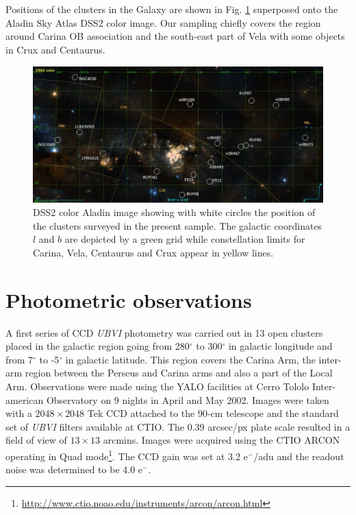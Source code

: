 \documentclass[draft]{aa}
\begin{document}
Positions of the clusters in the Galaxy are shown in Fig. \ref{fig1} superposed
onto the Aladin Sky Atlas DSS2 color image. Our sampling chiefly covers the
region around Carina OB association and the south-east part of Vela with some
objects in Crux and Centaurus.

\begin{figure}[ht]
    \centering
    \includegraphics[width=\hsize]{../figs/DSS2color.png}
    \caption{DSS2 color Aladin image showing with white circles the position of
    the clusters surveyed in the present sample. The galactic coordinates $l$
    and $b$ are depicted by a green grid while constellation limits for Carina,
    Vela, Centaurus and Crux appear in yellow lines.}
    \label{fig1}
\end{figure}




\section{Photometric observations}
\label{sec:photo_obs}

A first series of CCD \emph{UBVI} photometry was carried out in 13 open clusters
placed in the galactic region going from 280$^\circ$ to 300$^\circ$ in galactic
longitude and from 7$^\circ$ to -5$^\circ$ in galactic latitude. This region
covers the Carina Arm, the inter-arm region between the Perseus and Carina arms
and also a part of the Local Arm.
Observations were made using the YALO facilities at Cerro Tololo Inter-american
Observatory on 9 nights in April and May 2002. Images were taken with a
$2048\times2048$ Tek CCD attached to the 90-cm telescope and the standard set of
\textit{UBVI} filters available at CTIO. The 0.39 arcsec/px plate scale
resulted in a field of view of $13\times13$ arcmins. Images were acquired using
the CTIO ARCON operating in Quad
mode\footnote{\url{http://www.ctio.noao.edu/instruments/arcon/arcon.html}}. The
CCD gain was set at 3.2 e$^-$/adu and the readout noise was determined to be 4.0
e$^-$.
\end{document}
